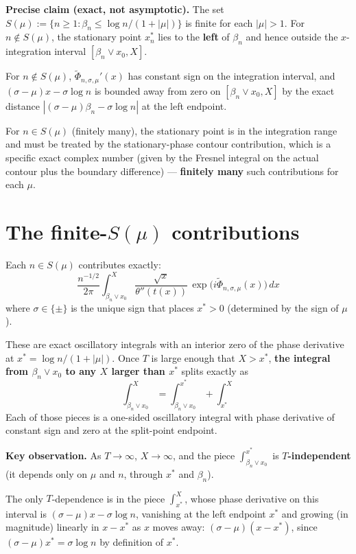 \textbf{Precise claim (exact, not asymptotic).} The set $S(\mu) := \{n\ge 1:\beta_{n}\le\log n/(1+|\mu|)\}$ is finite for each $|\mu|>1$. For $n\notin S(\mu)$, the stationary point $x^{*}_{n}$ lies to the \textbf{left} of $\beta_{n}$ and hence outside the $x$-integration interval $[\beta_{n}\vee x_{0},X]$.

For $n\notin S(\mu)$, $\widetilde\Phi_{n,\sigma,\mu}'(x)$ has constant sign on the integration interval, and $(\sigma-\mu)x-\sigma\log n$ is bounded away from zero on $[\beta_{n}\vee x_{0},X]$ by the exact distance $|(\sigma-\mu)\beta_{n}-\sigma\log n|$ at the left endpoint.

For $n\in S(\mu)$ (finitely many), the stationary point is in the integration range and must be treated by the stationary-phase contour contribution, which is a specific exact complex number (given by the Fresnel integral on the actual contour plus the boundary difference) --- \textbf{finitely many} such contributions for each $\mu$.

\section*{The finite-$S(\mu)$ contributions}

Each $n\in S(\mu)$ contributes exactly:
\[
\frac{n^{-1/2}}{2\pi}\int_{\beta_{n}\vee x_{0}}^{X}\!\!\frac{\sqrt{x}}{\theta''(t(x))}\,\exp\!\bigl(i\widetilde\Phi_{n,\sigma,\mu}(x)\bigr)\,dx
\]
where $\sigma\in\{\pm\}$ is the unique sign that places $x^{*}>0$ (determined by the sign of $\mu$).

These are exact oscillatory integrals with an interior zero of the phase derivative at $x^{*}=\log n/(1+|\mu|)$. Once $T$ is large enough that $X>x^{*}$, \textbf{the integral from $\beta_n\vee x_0$ to any $X$ larger than $x^{*}$} splits exactly as
\[
\int_{\beta_{n}\vee x_{0}}^{X} = \int_{\beta_{n}\vee x_{0}}^{x^{*}} + \int_{x^{*}}^{X}
\]
Each of those pieces is a one-sided oscillatory integral with phase derivative of constant sign and zero at the split-point endpoint.

\textbf{Key observation.} As $T\to\infty$, $X\to\infty$, and the piece $\int_{\beta_n\vee x_0}^{x^*}$ is \textbf{$T$-independent} (it depends only on $\mu$ and $n$, through $x^*$ and $\beta_n$).

The only $T$-dependence is in the piece $\int_{x^*}^{X}$, whose phase derivative on this interval is $(\sigma-\mu)x-\sigma\log n$, vanishing at the left endpoint $x^*$ and growing (in magnitude) linearly in $x-x^*$ as $x$ moves away: $(\sigma-\mu)(x-x^*)$, since $(\sigma-\mu)x^*=\sigma\log n$ by definition of $x^*$.

